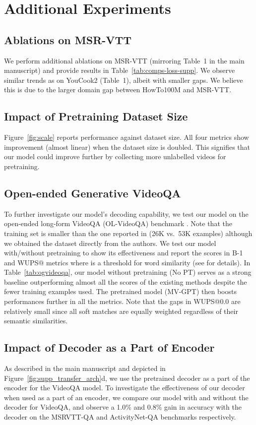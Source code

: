 \documentclass[10pt,twocolumn,letterpaper]{article}
\begin{document}
\section{Additional Experiments}
\label{sec:add_exps}

\subsection{Ablations on MSR-VTT}
We perform additional ablations on MSR-VTT (mirroring Table~1 in the main manuscript) and provide results in 
Table~\ref{tab:comps-loss-supp}. We observe similar trends as on YouCook2 (Table~1), albeit with smaller gaps. We believe this is due to the larger domain gap between HowTo100M and MSR-VTT. 

\subsection{Impact of Pretraining Dataset Size} \label{sec:supp-ds_size}


Figure~\ref{fig:scale} reports performance against dataset size. 
All four metrics show improvement (almost linear) when the dataset size is doubled. 
This signifies that our model could improve further by collecting more unlabelled videos for pretraining.

\subsection{Open-ended Generative VideoQA}
To further investigate our model's decoding capability, we test our model on the open-ended long-form VideoQA (OL-VideoQA) benchmark \cite{zhang2019open}.
Note that the training set is smaller than the one reported in \cite{zhang2019open} (26K vs.\ 53K examples) although we obtained the dataset directly from the authors.
We test our model with/without pretraining to show its effectiveness and report the scores in B-1 and WUPS@ metrics where  is a threshold for word similarity (see \cite{zhang2019open} for details).
In Table~\ref{tab:ogvideoqa}, our model without pretraining (No PT) serves as a strong baseline outperforming almost all the scores of the existing methods despite the fewer training examples used.
The pretrained model (MV-GPT) then boosts performances further in all the metrics.
Note that the gaps in WUPS@0.0 are relatively small since all soft matches are equally weighted regardless of their semantic similarities.



\subsection{Impact of Decoder as a Part of Encoder}
As described in the main manuscript and depicted in Figure~\ref{fig:supp_transfer_arch}d, we use the pretrained decoder as a part of the encoder for the VideoQA model. 
To investigate the effectiveness of our decoder when used as a part of an encoder,
we compare our model with and without the decoder for VideoQA, and observe a 1.0\% and 0.8\% gain in accuracy with the decoder on the MSRVTT-QA and ActivityNet-QA benchmarks respectively.
\end{document}
